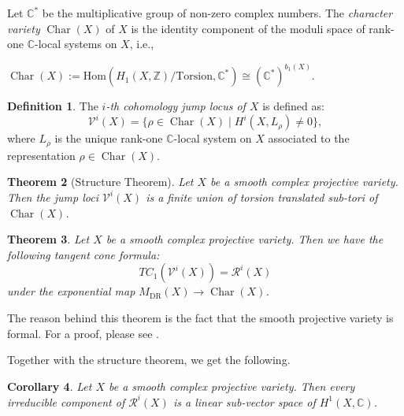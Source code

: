 \documentclass[11pt,reqno]{amsart}
\newtheorem{theorem}{Theorem}[section]
\newtheorem{corollary}[theorem]{Corollary}
\theoremstyle{definition}
\newtheorem{definition}[theorem]{Definition}
\theoremstyle{remark}
\newtheorem{remark}[theorem]{Remark}
\theoremstyle{cited}
\theoremstyle{citeddef}
\newcommand{\C}{\mathbb{C}}
\newcommand{\Hom}{\mathrm{Hom}}
\newcommand{\Q}{\mathbb{Q}}
\def\bc{\begin{corollary}}
\def\ec{\end{corollary}}
\def\br{\begin{remark}}
\def\er{\end{remark}}
\def\bd{\begin{definition}}
\def\ed{\end{definition}}
\DeclareMathOperator{\Alb}{Alb}
\DeclareMathOperator{\Char}{Char}
\def\bC{\mathbb{C}}
\def\bZ{\mathbb{Z}}
\newcommand{\sR}{\mathcal{R}}
\newcommand\sV{{\mathcal V}}
\DeclareMathOperator{\DR}{DR}
\begin{document}
Let $\C^{\ast}$ be the multiplicative group of non-zero complex numbers.
The {\it character variety} $\Char(X)$ of $X$ is the identity component of the moduli space of rank-one $\bC$-local systems on $X$, i.e., 
\begin{center}
$\Char(X):= 
\Hom (H_1(X,\bZ)/\text{Torsion}, \bC^*)\cong (\bC^*)^{b_1(X)}.$
\end{center}

\bd The {\it $i$-th cohomology jump locus of $X$} is defined as: 
$${\sV^{i}(X)=\lbrace \rho\in \Char(X) \mid  H^{i}(X,L_{\rho})\neq 0 \rbrace},$$ 
where $L_{\rho}$ is the unique rank-one $\bC$-local system  on $X$ associated to the representation $\rho\in \Char(X) $.\ed


\begin{theorem}[Structure Theorem] Let $X$ be a smooth complex projective variety. Then the jump loci $\sV^i(X)$ is a finite union of torsion translated sub-tori of $\Char(X)$.
\end{theorem}




\begin{theorem} Let $X$ be a smooth complex projective variety.  Then we have the following tangent cone formula:
$$ TC_1( \sV^i(X)) = \sR^i(X)$$
under the exponential map $M_{\DR}(X) \to \Char(X)$. 
\end{theorem} 
The reason behind this theorem is the fact that the smooth projective variety is formal.  For a proof, please see \cite{S}.

Together with the structure theorem, we get the following. 

\bc Let $X$ be a smooth complex projective variety. Then every irreducible component of $\sR^i(X)$ is a linear sub-vector space of $H^1(X,\C)$.
\ec
\end{document}
